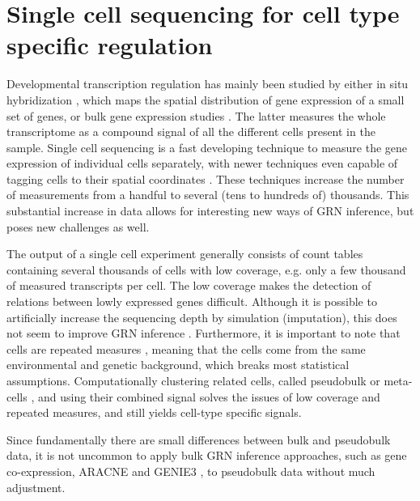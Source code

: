 \section{Single cell sequencing for cell type specific regulation}

Developmental transcription regulation has mainly been studied by either in situ hybridization \cite{Jensen_2014}, which maps the spatial distribution of gene expression of a small set of genes, or bulk gene expression studies \cite{Wang_2009}. The latter measures the whole transcriptome as a compound signal of all the different cells present in the sample. Single cell sequencing is a fast developing technique to measure the gene expression of individual cells separately, with newer techniques even capable of tagging cells to their spatial coordinates \cite{Longo_2021,Borm_2022}. These techniques increase the number of measurements from a handful to several (tens to hundreds of) thousands. This substantial increase in data allows for interesting new ways of GRN inference, but poses new challenges as well.

The output of a single cell experiment generally consists of count tables containing several thousands of cells with low coverage, e.g. only a few thousand of measured transcripts per cell. The low coverage makes the detection of relations between lowly expressed genes difficult. Although it is possible to artificially increase the sequencing depth by simulation (imputation), this does not seem to improve GRN inference \cite{Ly_2022,McCalla_2021}. Furthermore, it is important to note that cells are repeated measures \cite{Zimmerman_2021}, meaning that the cells come from the same environmental and genetic background, which breaks most statistical assumptions. Computationally clustering related cells, called pseudobulk or meta-cells \cite{Baran_2019}, and using their combined signal solves the issues of low coverage and repeated measures, and still yields cell-type specific signals.

Since fundamentally there are small differences between bulk and pseudobulk data, it is not uncommon to apply bulk GRN inference approaches, such as gene co-expression, ARACNE \cite{Margolin_2006} and GENIE3 \cite{Huynh_Thu_2010}, to pseudobulk data without much adjustment.

